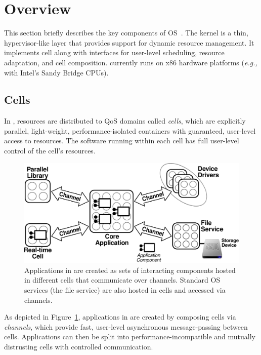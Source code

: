 \section{\tess Overview}

This section briefly describes the key components of \tess OS~\cite{tess,tess_resource,tess_dac,tess_audio, tess_gui}.
The \tess kernel is a thin, hypervisor-like layer that provides support
for dynamic resource management.  It implements cell along with interfaces for user-level scheduling, resource
adaptation, and cell composition.  \tess currently runs on x86 hardware
platforms (\emph{e.g.,} with Intel's Sandy Bridge CPUs). 


\subsection{Cells}\label{sec:cell-model}

In \tess, resources are distributed to QoS domains called
\emph{cells}, which are explicitly parallel, light-weight, performance-isolated containers
with guaranteed, user-level access to resources. The software running within each cell has full
user-level control of the cell's resources.

\begin{figure}[tp]
\centering
\includegraphics[width=1.0\columnwidth]{Figures/app-split-into-cells.pdf}
\caption{
Applications in \tess are created as sets of interacting components
hosted in different cells that communicate over channels.
Standard OS services (\eg the file service) are also hosted in cells and
accessed via channels.
}
\label{fig:app-split-into-cells}
\end{figure}

As depicted in Figure~\ref{fig:app-split-into-cells}, applications
in \tess are created by composing cells via \emph{channels}, which
provide fast, user-level asynchronous message-passing between cells.
Applications can then be split into performance-incompatible and
mutually distrusting cells with controlled communication. 


